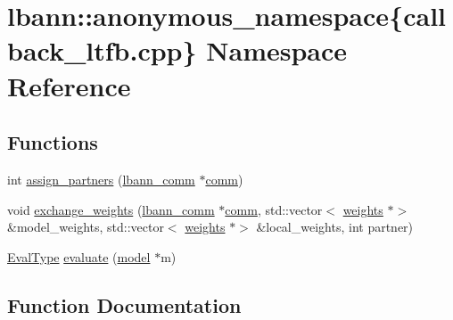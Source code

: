 \hypertarget{namespacelbann_1_1anonymous__namespace_02callback__ltfb_8cpp_03}{}\section{lbann\+:\+:anonymous\+\_\+namespace\{callback\+\_\+ltfb.\+cpp\} Namespace Reference}
\label{namespacelbann_1_1anonymous__namespace_02callback__ltfb_8cpp_03}
\subsection*{Functions}
\begin{DoxyCompactItemize}
\item 
int \hyperlink{namespacelbann_1_1anonymous__namespace_02callback__ltfb_8cpp_03_a1865e25ff1f3b6ad417d1853ea0bc6f4}{assign\+\_\+partners} (\hyperlink{classlbann_1_1lbann__comm}{lbann\+\_\+comm} $\ast$\hyperlink{file__io_8cpp_ab048c6f9fcbcfaa57ce68b00263dbebe}{comm})
\item 
void \hyperlink{namespacelbann_1_1anonymous__namespace_02callback__ltfb_8cpp_03_a2b155d39e6dba02a34a7c58d804d865e}{exchange\+\_\+weights} (\hyperlink{classlbann_1_1lbann__comm}{lbann\+\_\+comm} $\ast$\hyperlink{file__io_8cpp_ab048c6f9fcbcfaa57ce68b00263dbebe}{comm}, std\+::vector$<$ \hyperlink{classlbann_1_1weights}{weights} $\ast$$>$ \&model\+\_\+weights, std\+::vector$<$ \hyperlink{classlbann_1_1weights}{weights} $\ast$$>$ \&local\+\_\+weights, int partner)
\item 
\hyperlink{base_8hpp_a3266f5ac18504bbadea983c109566867}{Eval\+Type} \hyperlink{namespacelbann_1_1anonymous__namespace_02callback__ltfb_8cpp_03_a2525bf058156612d7847d0754277e4fc}{evaluate} (\hyperlink{classlbann_1_1model}{model} $\ast$m)
\end{DoxyCompactItemize}


\subsection{Function Documentation}
\mbox{\label{namespacelbann_1_1anonymous__namespace_02callback__ltfb_8cpp_03_a1865e25ff1f3b6ad417d1853ea0bc6f4}} 
